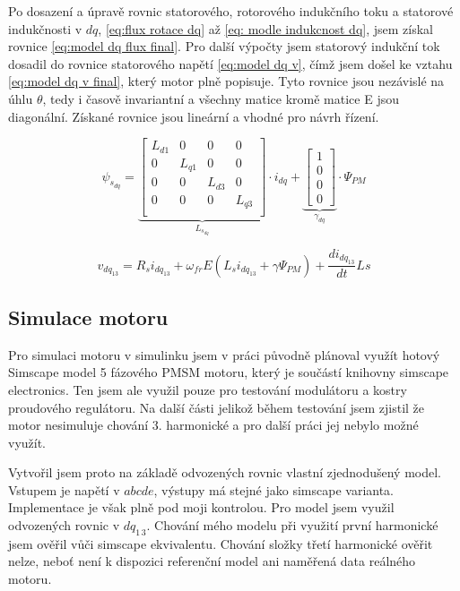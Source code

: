 
Po dosazení a úpravě rovnic statorového, rotorového indukčního toku a statorové indukčnosti v $dq$, \ref{eq:flux rotace dq} až \ref{eq: modle indukcnost dq}, jsem získal rovnice \ref{eq:model dq flux final}. Pro další výpočty jsem statorový indukční tok dosadil do rovnice statorového napětí \ref{eq:model dq v}, čímž jsem došel ke vztahu \ref{eq:model dq v final}, který motor plně popisuje. Tyto rovnice jsou nezávislé na úhlu $\theta$, tedy i časově invariantní a všechny matice kromě matice E jsou diagonální. Získané rovnice jsou lineární a vhodné pro návrh řízení.



\begin{equation}
    \label{eq:model dq flux final}
    \psi_{s_{dq}}=
    \underbrace{
     \begin{bmatrix}    
        L_{d1} &0&0&0\\
        0 &L_{q1}&0&0\\
        0 &0&L_{d3}&0\\
        0 &0&0&L_{q3}\\
    \end{bmatrix}}_{L_{s_{dq}}}
    \cdot i_{dq}+ 
    \underbrace{
    \begin{bmatrix}
        1 \\ 0 \\0 \\0 
    \end{bmatrix}}_{\gamma_{dq}} \cdot \Psi_{PM}
\end{equation}



\begin{equation}
    \label{eq:model dq v final}
    v_{dq_{13}} = R_s i_{dq_{13}}+ \omega_{fr}E \left( L_{s}i_{dq_{13}} + \gamma \Psi_{PM}\right) + \frac{di_{dq_{13}}}{dt} Ls
\end{equation}



\subsection{Simulace motoru}
Pro simulaci motoru v simulinku jsem v práci původně plánoval využít hotový Simscape model 5 fázového PMSM motoru, který je součástí knihovny simscape electronics. Ten jsem ale využil pouze pro testování modulátoru a kostry proudového regulátoru. Na další části jelikož během testování jsem zjistil že motor nesimuluje chování 3. harmonické a pro další práci jej nebylo možné využít. 

Vytvořil jsem proto na základě odvozených rovnic vlastní zjednodušený model. Vstupem je napětí v $abcde$, výstupy má stejné jako simscape varianta. Implementace je však plně pod moji kontrolou. Pro model jsem využil odvozených rovnic v $dq_{1\,3}$. Chování mého modelu při využití první harmonické jsem ověřil vůči simscape ekvivalentu. Chování složky třetí 
harmonické ověřit nelze, neboť není k dispozici referenční model ani naměřená data reálného motoru.